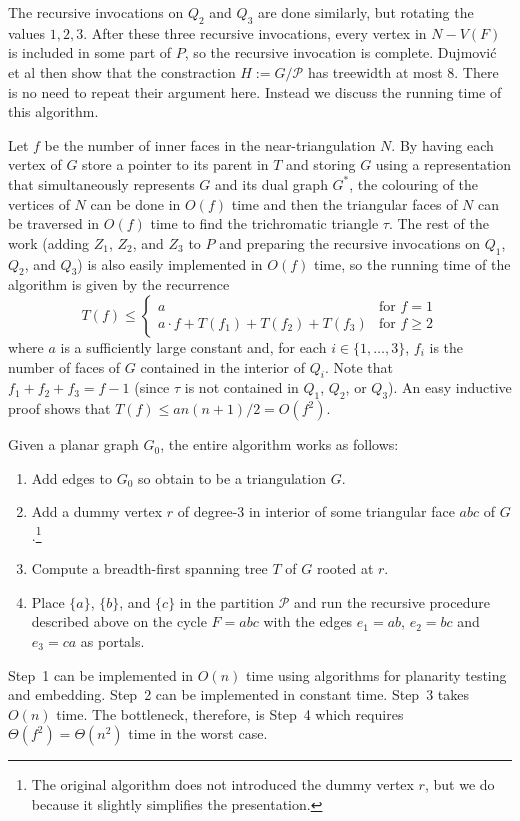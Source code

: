 \documentclass[kpfonts]{patmorin}
\let\le\leqslant
\let\ge\geqslant
\begin{document}
The recursive invocations on $Q_2$ and $Q_3$ are done similarly, but rotating the values $1,2,3$.  After these three recursive invocations, every vertex in $N-V(F)$ is included in some part of $P$, so the recursive invocation is complete.  Dujmović et al then show that the constraction $H:=G/\mathcal{P}$ has treewidth at most 8. There is no need to repeat their argument here.  Instead we discuss the running time of this algorithm.

Let $f$ be the number of inner faces in the near-triangulation $N$.  By having each vertex of $G$ store a pointer to its parent in $T$ and storing $G$ using a representation that simultaneously represents $G$ and its dual graph $G^*$, the colouring of the vertices of $N$ can be done in $O(f)$ time and then the triangular faces of $N$ can be traversed in $O(f)$ time to find the trichromatic triangle $\tau$. The rest of the work (adding $Z_1$, $Z_2$, and $Z_3$ to $P$ and preparing the recursive invocations on $Q_1$, $Q_2$, and $Q_3$) is also easily implemented in $O(f)$ time, so the running time of the algorithm is given by the recurrence
\[  T(f) \le \begin{cases}
           a & \text{for $f=1$} \\
           a\cdot f + T(f_1)+T(f_2)+T(f_3) & \text{for $f\ge 2$}
         \end{cases}
 \]
where $a$ is a sufficiently large constant and, for each $i\in\{1,\ldots,3\}$, $f_i$ is the number of faces of $G$ contained in the interior of $Q_i$.
Note that $f_1+f_2+f_3=f-1$ (since $\tau$ is not contained in $Q_1$, $Q_2$, or $Q_3$).  An easy inductive proof shows that $T(f) \le an(n+1)/2 = O(f^2)$.  

Given a planar graph $G_0$, the entire algorithm works as follows:
\begin{enumerate}
  \item Add edges to $G_0$ so obtain to be a triangulation $G$.
  \item Add a dummy vertex $r$ of degree-3 in interior of some triangular face $abc$ of $G$.\footnote{The original algorithm does not introduced the dummy vertex $r$, but we do because it slightly simplifies the presentation.}
  \item Compute a breadth-first spanning tree $T$ of $G$ rooted at $r$.
  \item Place $\{a\}$, $\{b\}$, and $\{c\}$ in the partition $\mathcal{P}$ and run the recursive procedure described above on the cycle $F=abc$ with the edges $e_1=ab$, $e_2=bc$ and $e_3=ca$ as portals.
\end{enumerate}
Step~1 can be implemented in $O(n)$ time using algorithms for planarity testing and embedding. Step~2 can be implemented in constant time.  Step~3 takes $O(n)$ time.  The bottleneck, therefore, is Step~4 which requires $\Theta(f^2)=\Theta(n^2)$ time in the worst case.
\end{document}
